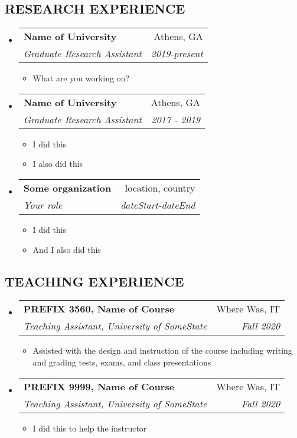 \documentclass[letterpaper,11pt]{article}
\makeatletter
\newcommand{\resitem}[1]{\item #1 \vspace{-2pt}}
\newcommand{\ressubheading}[4]{
\begin{tabular*}{6.5in}{l@{\extracolsep{\fill}}r}
		\textbf{#1} & #2 \\
		\textit{#3} & \textit{#4} \\
\end{tabular*}\vspace{-6pt}}
\makeatother
\begin{document}
\subsection*{RESEARCH EXPERIENCE}
\begin{itemize}
\item 
    \ressubheading{Name of University}{Athens, GA}{Graduate Research Assistant}{2019-present}
    \begin{itemize}
        \item What are you working on? 
    \end{itemize}
\item
    \ressubheading{Name of University}{Athens, GA}{Graduate Research Assistant}{2017 - 2019}
    \begin{itemize}
        \item I did this 
        \item I also did this 
    \end{itemize}
\item
	\ressubheading{Some organization}{location, country}{Your role}{dateStart-dateEnd}
	\begin{itemize}
		\resitem{I did this}
		\resitem{And I also did this}
	\end{itemize}
\end{itemize}
\vspace{0.1in}
\subsection*{TEACHING EXPERIENCE}
\begin{itemize}
\item 
    \ressubheading{PREFIX 3560, Name of Course}{Where Was, IT}{Teaching Assistant, University of SomeState}{Fall 2020}
    \begin{itemize}
        \item Assisted with the design and instruction of the course including writing and grading tests, exams, and class presentations 
    \end{itemize}
\item 
    \ressubheading{PREFIX 9999, Name of Course}{Where Was, IT}{Teaching Assistant, University of SomeState}{Fall 2020}
    \begin{itemize}
        \item I did this to help the instructor
    \end{itemize}
\end{itemize}
\vspace{0.1in}
\end{document}
